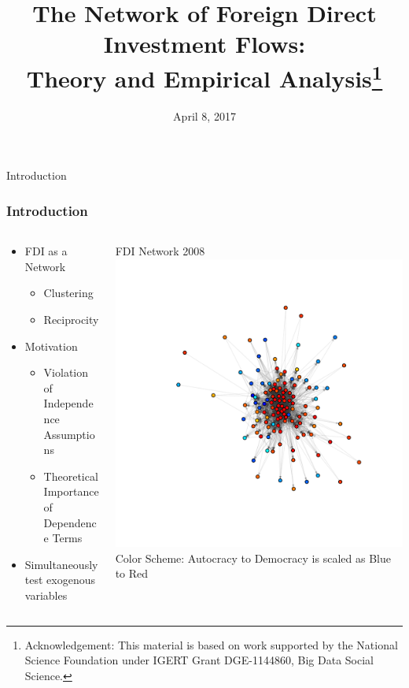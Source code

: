 \documentclass{beamer}
\title[The Network of FDI Flows]{The Network of Foreign Direct Investment Flows:\\Theory and Empirical Analysis\thanks{\scriptsize {Acknowledgement: This material is based on work supported by the National Science Foundation under IGERT Grant DGE-1144860, Big Data Social Science.}}}
\author[J.\,Schoeneman, B. \,Zhu \& B.\,Desmarais]{%
  \texorpdfstring{%
    \begin{columns}
      \column{.3\linewidth}
      \centering
      John Schoeneman{\thanks{\scriptsize{Pennsylvania State University}}} \\ \scriptsize{jbs5686@psu.edu\\ PhD Candidate}
      \column{.3\linewidth}
      \centering
      Boliang Zhu{\samethanks[2]} \\ \scriptsize{bxz14@psu.edu\\ Assistant Professor}
    \end{columns}
    \vspace{12pt}
    \begin{columns}
      \column{.3\linewidth}
      \centering
      Bruce Desmarais{\samethanks[2]}\\ \scriptsize{bdesmarais@psu.edu\\ Associate Professor}
    \end{columns}
 }
 {Author 1, Author 2, Author 3}
}
\date{April 8, 2017}
\begin{document}
\begin{frame}
  \titlepage
\end{frame}




\begin{frame}{Introduction}

\frametitle{Introduction}
  \begin{columns}[T]
    \begin{column}{.5\textwidth}
\vspace{10mm}
\begin{itemize}
\item{FDI as a Network}
\begin{itemize}
\item{Clustering}
\item{Reciprocity}
 \end{itemize}
 \item{Motivation}
 \begin{itemize}
\item{Violation of Independence Assumptions}
\item{Theoretical Importance of Dependence Terms}
 \end{itemize}
  \item{Simultaneously test exogenous variables}
 \end{itemize}
    \end{column}
    \begin{column}{.5\textwidth}
    \begin{block}{FDI Network 2008}
    \includegraphics[scale=.4]{slides_figures/fdiNet2008.pdf}
 \small{\\ Color Scheme: Autocracy to Democracy is scaled as Blue to Red}
    \end{block}
    \end{column}
  \end{columns}


\end{frame}
\end{document}

